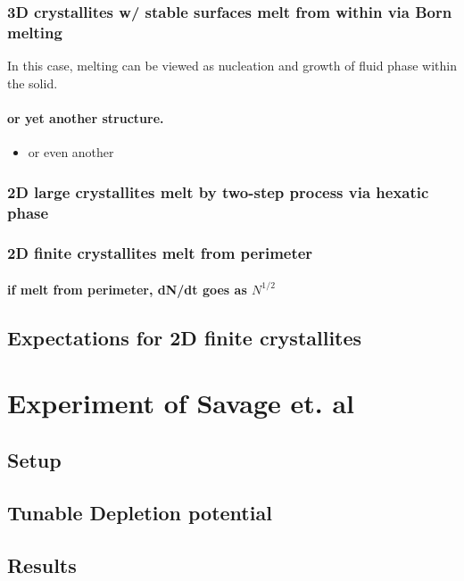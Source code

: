 \documentclass{umthesis}
\begin{document}
\subsubsection{3D crystallites w/ stable surfaces melt from within via Born melting}
\label{sec-1.1.1.1}

In this case, melting can be viewed as nucleation and growth of fluid phase within the solid.
\paragraph{or yet another structure.}
\label{sec-1.1.1.1.1}
\begin{itemize}

\item or even another\\
\label{sec-1.1.1.1.1.1}%
\end{itemize} %
\subsubsection{2D large crystallites melt by two-step process via hexatic phase}
\label{sec-1.1.1.2}
\subsubsection{2D finite crystallites melt from perimeter}
\label{sec-1.1.1.3}
\paragraph{if melt from perimeter, dN/dt goes as $N^{1/2}$}
\label{sec-1.1.1.3.1}
\subsection{Expectations for 2D finite crystallites}
\label{sec-1.1.2}
\section{Experiment of Savage et. al}
\label{sec-1.2}
\subsection{Setup}
\label{sec-1.2.1}
\subsection{Tunable Depletion potential}
\label{sec-1.2.2}
\subsection{Results}
\label{sec-1.2.3}
\end{document}
